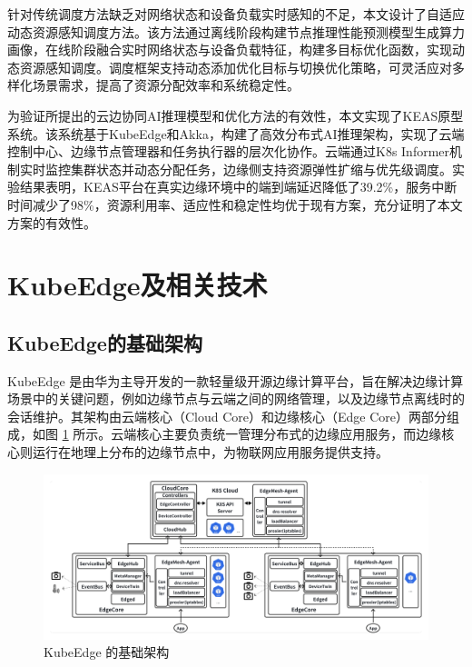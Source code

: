     
针对传统调度方法缺乏对网络状态和设备负载实时感知的不足，本文设计了自适应动态资源感知调度方法。该方法通过离线阶段构建节点推理性能预测模型生成算力画像，在线阶段融合实时网络状态与设备负载特征，构建多目标优化函数，实现动态资源感知调度。调度框架支持动态添加优化目标与切换优化策略，可灵活应对多样化场景需求，提高了资源分配效率和系统稳定性。

为验证所提出的云边协同AI推理模型和优化方法的有效性，本文实现了KEAS原型系统。该系统基于KubeEdge和Akka，构建了高效分布式AI推理架构，实现了云端控制中心、边缘节点管理器和任务执行器的层次化协作。云端通过K8s Informer机制实时监控集群状态并动态分配任务，边缘侧支持资源弹性扩缩与优先级调度。实验结果表明，KEAS平台在真实边缘环境中的端到端延迟降低了39.2\%，服务中断时间减少了98\%，资源利用率、适应性和稳定性均优于现有方案，充分证明了本文方案的有效性。




\section{KubeEdge及相关技术}

\subsection{KubeEdge的基础架构}

KubeEdge 是由华为主导开发的一款轻量级开源边缘计算平台，旨在解决边缘计算场景中的关键问题，例如边缘节点与云端之间的网络管理，以及边缘节点离线时的会话维护。其架构由云端核心（Cloud Core）和边缘核心（Edge Core）两部分组成，如图 \ref{fig:2-3kubeedge} 所示。云端核心主要负责统一管理分布式的边缘应用服务，而边缘核心则运行在地理上分布的边缘节点中，为物联网应用服务提供支持。

\begin{figure}[ht]
  \centering
  \includegraphics[width=\linewidth]{pics/2-2kubeedge.png}
  \caption{KubeEdge 的基础架构}
  \label{fig:2-3kubeedge}
\end{figure}


